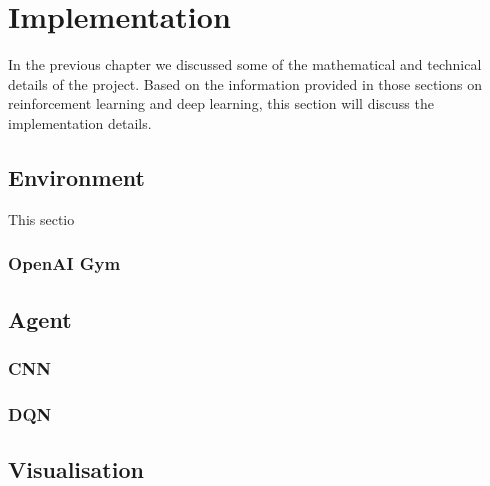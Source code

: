 \chapter{Implementation}
In the previous chapter we discussed some of the mathematical and technical details of the project. Based on the information provided in those sections on reinforcement learning and deep learning, this section will discuss the implementation details.

\section{Environment}
This sectio

\subsection{OpenAI Gym}

\section{Agent}
\subsection{CNN}

\subsection{DQN}

\section{Visualisation}